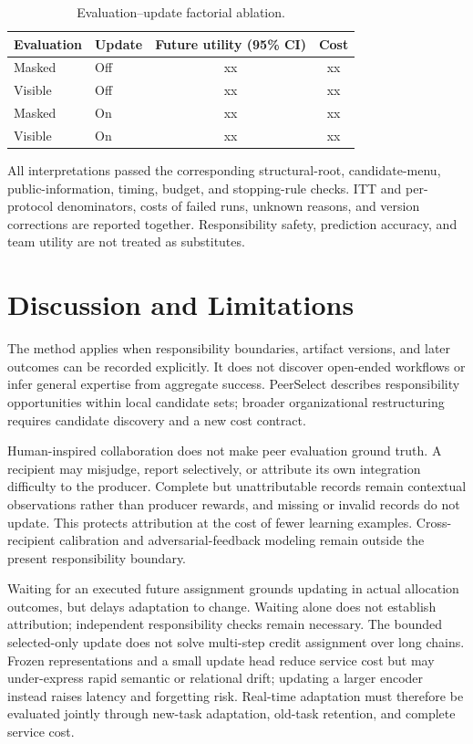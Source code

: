 \documentclass[sigconf,anonymous]{aamas}
\begin{document}
\begin{table}[t]
\centering\scriptsize
\setlength{\tabcolsep}{3pt}
\begin{tabular}{llcc}
\toprule
Evaluation & Update & Future utility (95\% CI) & Cost \\
\midrule
Masked & Off & xx & xx \\
Visible & Off & xx & xx \\
Masked & On & xx & xx \\
Visible & On & xx & xx \\
\bottomrule
\end{tabular}
\caption{Evaluation--update factorial ablation.}
\label{tab:factorial-results}
\end{table}

All interpretations passed the corresponding structural-root, candidate-menu, public-information, timing, budget, and stopping-rule checks. ITT and per-protocol denominators, costs of failed runs, unknown reasons, and version corrections are reported together. Responsibility safety, prediction accuracy, and team utility are not treated as substitutes.

\section{Discussion and Limitations}
The method applies when responsibility boundaries, artifact versions, and later outcomes can be recorded explicitly. It does not discover open-ended workflows or infer general expertise from aggregate success. PeerSelect describes responsibility opportunities within local candidate sets; broader organizational restructuring requires candidate discovery and a new cost contract.

Human-inspired collaboration does not make peer evaluation ground truth. A recipient may misjudge, report selectively, or attribute its own integration difficulty to the producer. Complete but unattributable records remain contextual observations rather than producer rewards, and missing or invalid records do not update. This protects attribution at the cost of fewer learning examples. Cross-recipient calibration and adversarial-feedback modeling remain outside the present responsibility boundary.

Waiting for an executed future assignment grounds updating in actual allocation outcomes, but delays adaptation to change. Waiting alone does not establish attribution; independent responsibility checks remain necessary. The bounded selected-only update does not solve multi-step credit assignment over long chains. Frozen representations and a small update head reduce service cost but may under-express rapid semantic or relational drift; updating a larger encoder instead raises latency and forgetting risk. Real-time adaptation must therefore be evaluated jointly through new-task adaptation, old-task retention, and complete service cost.
\end{document}
